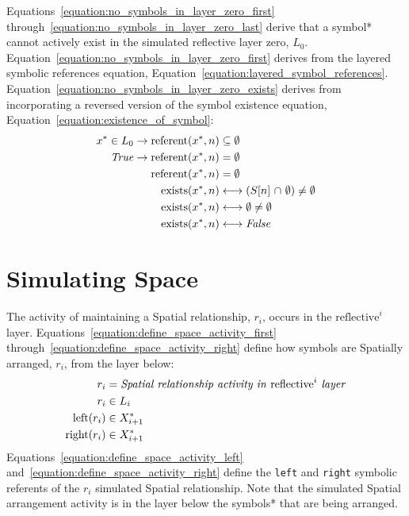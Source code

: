 Equations~\ref{equation:no_symbols_in_layer_zero_first}
through~\ref{equation:no_symbols_in_layer_zero_last} derive that a
symbol* cannot actively exist in the simulated reflective layer zero,
$L_0$.  Equation~\ref{equation:no_symbols_in_layer_zero_first} derives
from the layered symbolic references equation,
Equation~\ref{equation:layered_symbol_references}.
Equation~\ref{equation:no_symbols_in_layer_zero_exists} derives from
incorporating a reversed version of the symbol existence equation,
Equation~\ref{equation:existence_of_symbol}:
\begin{align}
\label{equation:no_symbols_in_layer_zero_first}
       x^* \in L_0 \rightarrow \text{referent}(x^*, n) &\subseteq \emptyset \\
\text{\emph{True}} \rightarrow \text{referent}(x^*, n) &= \emptyset \\
                               \text{referent}(x^*, n) &= \emptyset \\
\label{equation:no_symbols_in_layer_zero_exists}
\text{exists}(x^*, n) &\longleftrightarrow (S[n] ~{\cap}~ \emptyset) \neq \emptyset \\
\text{exists}(x^*, n) &\longleftrightarrow \emptyset \neq \emptyset \\
\text{exists}(x^*, n) &\longleftrightarrow \text{\emph{False}}
\label{equation:no_symbols_in_layer_zero_last}
\end{align}

\section{Simulating Space}

The activity of maintaining a Spatial relationship, $r_i$, occurs in
the $\text{reflective}^i$ layer.
Equations~\ref{equation:define_space_activity_first}
through~\ref{equation:define_space_activity_right} define how symbols
are Spatially arranged, $r_i$, from the layer below:
\begin{align}
\label{equation:define_space_activity_first}
              r_i &= \text{\emph{Spatial relationship activity in} reflective}^i\text{\emph{ layer}} \\
              r_i &\in L_i \\
\label{equation:define_space_activity_left}
 \text{left}(r_i) &\in X^*_{i+1} \\
\label{equation:define_space_activity_right}
\text{right}(r_i) &\in X^*_{i+1}
\end{align}
Equations~\ref{equation:define_space_activity_left}
and~\ref{equation:define_space_activity_right} define the {\tt left}
and {\tt right} symbolic referents of the $r_i$ simulated Spatial
relationship.  Note that the simulated Spatial arrangement activity is
in the layer below the symbols* that are being arranged.

